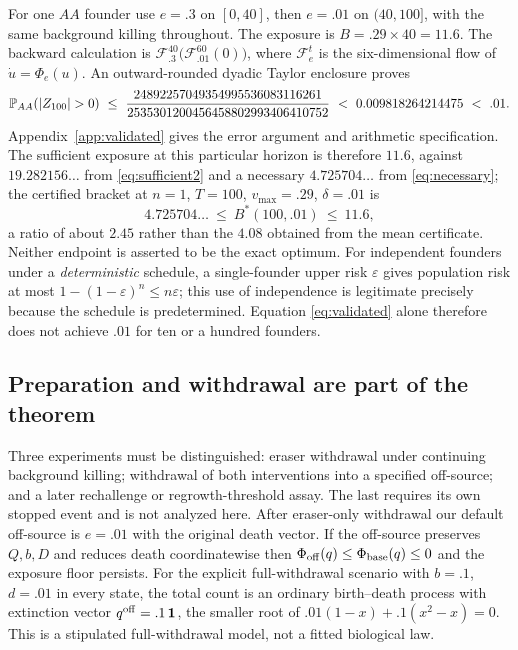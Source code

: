 For one $AA$ founder use $e=.3$ on $[0,40]$, then $e=.01$ on $(40,100]$, with
the same background killing throughout. The exposure is $B=.29\times40=11.6$.
The backward calculation is
$\mathcal F_{.3}^{40}\bigl(\mathcal F_{.01}^{60}(0)\bigr)$, where
$\mathcal F_e^t$ is the six-dimensional flow of $\dot u=\Phi_e(u)$. An
outward-rounded dyadic Taylor enclosure proves
\begin{equation}\label{eq:validated}
 \Prob_{AA}(|Z_{100}|>0)
 \ \le\ \frac{24892257049354995536083116261}
             {2535301200456458802993406410752}
 \ <\ 0.009818264214475\ <\ .01 .
\end{equation}
Appendix~\ref{app:validated} gives the error argument and arithmetic
specification. The sufficient exposure at this particular horizon is therefore
$11.6$, against $19.282156\ldots$ from \eqref{eq:sufficient2} and a necessary
$4.725704\ldots$ from \eqref{eq:necessary}; the certified bracket at $n=1$,
$T=100$, $v_{\max}=.29$, $\delta=.01$ is
\[
 4.725704\ldots\ \le\ B^*(100,.01)\ \le\ 11.6 ,
\]
a ratio of about $2.45$ rather than the $4.08$ obtained from the mean
certificate. Neither endpoint is asserted to be the exact optimum. For
independent founders under a \emph{deterministic} schedule, a single-founder
upper risk $\varepsilon$ gives population risk at most
$1-(1-\varepsilon)^n\le n\varepsilon$; this use of independence is legitimate
precisely because the schedule is predetermined. Equation
\eqref{eq:validated} alone therefore does not achieve $.01$ for ten or a
hundred founders.

\subsection{Preparation and withdrawal are part of the theorem}
\label{sec:withdrawal}

Three experiments must be distinguished: eraser withdrawal under continuing
background killing; withdrawal of both interventions into a specified
off-source; and a later rechallenge or regrowth-threshold assay. The last
requires its own stopped event and is not analyzed here. After eraser-only
withdrawal our default off-source is $e=.01$ with the original death vector. If
the off-source preserves $Q,b,D$ and reduces death coordinatewise then
$\Phi_{\mathrm{off}}(q)\le\Phi_{\mathrm{base}}(q)\le0$ and the exposure floor persists. For the
explicit full-withdrawal scenario with $b=.1$, $d=.01$ in every state, the total
count is an ordinary birth--death process with extinction vector
$q^{\mathrm{off}}=.1\,\mathbf1$, the smaller root of $.01(1-x)+.1(x^2-x)=0$. This is
a stipulated full-withdrawal model, not a fitted biological law.

